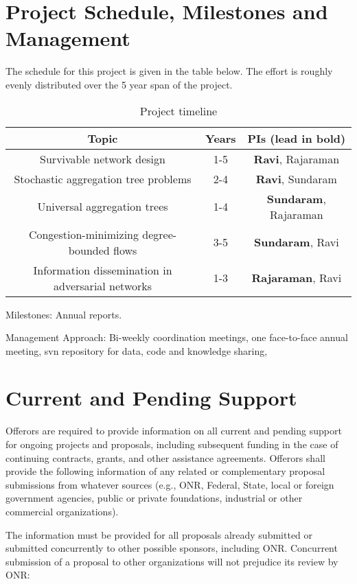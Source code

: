 \section{Project Schedule, Milestones and Management}

The schedule for this project is given in the table below.  The
effort is roughly evenly distributed over the 5 year span of the
project.

\begin{table}[h]
\begin{tabular}{||c|c|c||}
\hline\hline
{\bf Topic} & {\bf Years} & {\bf PIs (lead in bold)}\\\hline\hline
Survivable network design & 1-5 & {\bf Ravi}, Rajaraman\\\hline
Stochastic aggregation tree problems & 2-4 & {\bf Ravi}, Sundaram\\\hline
Universal aggregation trees  & 1-4 & {\bf Sundaram}, Rajaraman\\ \hline
Congestion-minimizing degree-bounded flows & 3-5 & {\bf Sundaram}, Ravi\\ \hline
Information dissemination in adversarial networks & 1-3 & {\bf Rajaraman}, Ravi\\ \hline
\end{tabular}
\caption{Project timeline}
\end{table}

Milestones: Annual reports.

Management Approach: Bi-weekly coordination meetings, one face-to-face annual meeting, svn  repository for data, code and knowledge sharing, 


\section{Current and Pending Support}


Offerors are required to provide
information on all current and pending support for ongoing projects and proposals, including
subsequent funding in the case of continuing contracts, grants, and other assistance agreements.
Offerors shall provide the following information of any related or complementary proposal
submissions from whatever sources (e.g., ONR, Federal, State, local or foreign government
agencies, public or private foundations, industrial or other commercial organizations).

The information must be provided for all proposals already submitted or submitted concurrently
to other possible sponsors, including ONR. Concurrent submission of a proposal to other
organizations will not prejudice its review by ONR: 

